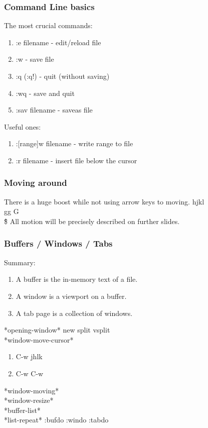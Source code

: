 \documentclass{beamer}
\begin{document}
\begin{frame}
  \frametitle{Command Line basics}
  The most crucial commands:
  \begin{enumerate}
    \item :e filename - edit/reload file
    \item :w - save file
    \item :q (:q!) - quit (without saving)
    \item :wq - save and quit
    \item :sav filename - saveas file
  \end{enumerate}

  Useful ones:
  \begin{enumerate}
    \item :[range]w filename - write range to file
    \item :r filename - insert file below the cursor
  \end{enumerate}
\end{frame}

\begin{frame}
  \frametitle{Moving around}
  There is a huge boost while not using arrow keys to moving.
  hjkl \\
  gg G \\
  \^ \$
  All motion will be precisely described on further slides.
\end{frame}

\begin{frame}
  \frametitle{Buffers / Windows / Tabs}

  Summary:
  \begin{enumerate}
    \item A buffer is the in-memory text of a file.
    \item A window is a viewport on a buffer.
    \item A tab page is a collection of windows.
  \end{enumerate}

  *opening-window* new split vsplit \\
  *window-move-cursor*
  \begin{enumerate}
    \item C-w jhlk
    \item C-w C-w
  \end{enumerate}
  *window-moving* \\
  *window-resize* \\
  *buffer-list* \\
  *list-repeat* :bufdo :windo :tabdo
\end{frame}
\end{document}
